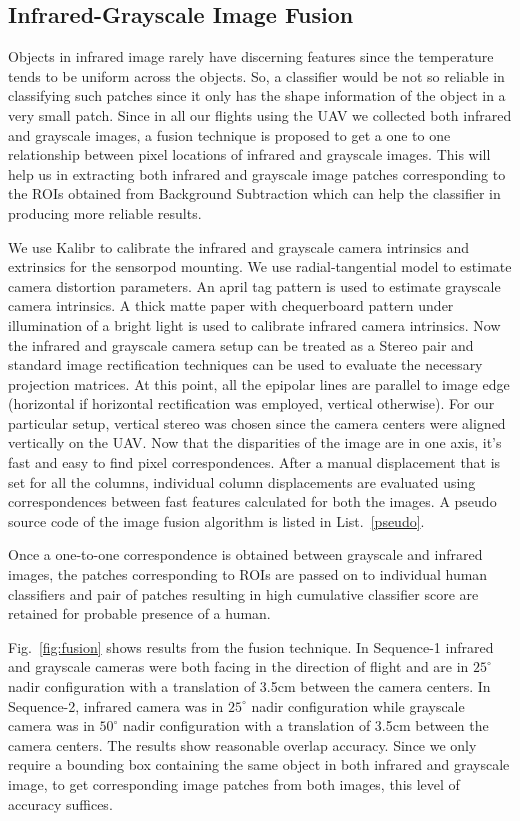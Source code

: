 \documentclass[runningheads]{llncs}
\begin{document}
\subsection{Infrared-Grayscale Image Fusion} 

Objects in infrared image rarely have discerning features since the temperature tends to be uniform across the objects. So, a classifier would be not so reliable in classifying such patches since it only has the shape information of the object in a very small patch. Since in all our flights using the UAV we collected both infrared and grayscale images, a fusion technique is proposed to get a one to one relationship between pixel locations of infrared and grayscale images. This will help us in extracting both infrared and grayscale image patches corresponding to the ROIs obtained from Background Subtraction which can help the classifier in producing more reliable results.

We use Kalibr \cite{furgale2013unified} to calibrate the infrared and grayscale camera intrinsics and extrinsics for the sensorpod mounting. We use radial-tangential model to estimate camera distortion parameters. An april tag pattern is used to estimate grayscale camera intrinsics. A thick matte paper with chequerboard pattern under illumination of a bright light is used to calibrate infrared camera intrinsics. Now the infrared and grayscale camera setup can be treated as a Stereo pair and standard image rectification techniques \cite{planar_rect} can be used to evaluate the necessary projection matrices. At this point, all the epipolar lines are parallel to image edge (horizontal if horizontal rectification was employed, vertical otherwise). For our particular setup, vertical stereo was chosen since the camera centers were aligned vertically on the UAV. Now that the disparities of the image are in one axis, it's fast and easy to find pixel correspondences. After a manual displacement that is set for all the columns, individual column displacements are evaluated using correspondences between fast features calculated for both the images. A pseudo source code of the image fusion algorithm is listed in List.~\ref{pseudo}.

Once a one-to-one correspondence is obtained between grayscale and infrared images, the patches corresponding to ROIs are passed on to individual human classifiers and pair of patches resulting in high cumulative classifier score are retained for probable presence of a human.


Fig.~\ref{fig:fusion} shows results from the fusion technique. In Sequence-1 infrared and grayscale cameras were both facing in the direction of flight and are in $25^{\circ}$ nadir configuration with a translation of 3.5cm between the camera centers. In Sequence-2, infrared camera was in $25^{\circ}$ nadir configuration while grayscale camera was in $50^{\circ}$ nadir configuration with a translation of 3.5cm between the camera centers. The results show reasonable overlap accuracy. Since we only require a bounding box containing the same object in both infrared and grayscale image, to get corresponding image patches from both images, this level of accuracy suffices.
\end{document}
